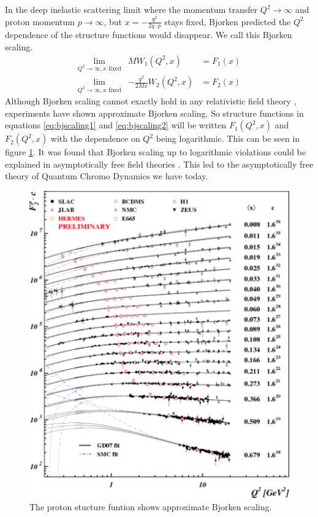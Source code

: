 \documentclass[abstract = on,listof=totoc, bibliography=totoc]{scrreprt}
\begin{document}
In the deep inelastic scattering limit where the momentum transfer $Q^2\rightarrow\infty$ and proton momentum $p\rightarrow\infty$, but $x = -\frac{q^2}{2q\cdot p}$ stays fixed, Bjorken predicted the $Q^2$ dependence of the structure functions would disappear. We call this Bjorken scaling.
\begin{eqnarray}
\lim\limits_{Q^2\rightarrow\infty, x \text{ fixed}}& MW_1(Q^2,x) &= F_1(x) \label{eq:bjscaling1}\\
\lim\limits_{Q^2\rightarrow\infty, x \text{ fixed}}& -\frac{q^2}{2Mx}W_2(Q^2,x) &= F_2(x) \label{eq:bjscaling2}
\end{eqnarray}
Although Bjorken scaling cannot exactly hold in any relativistic field theory \cite{AlderTungPhysRevLett.22.978}, experiments have shown approximate Bjorken scaling. So structure functions in equations \ref{eq:bjscaling1} and \ref{eq:bjscaling2} will be written $F_1(Q^2,x)$ and $F_2(Q^2,x)$ with the dependence on $Q^2$ being logarithmic. This can be seen in figure \ref{fig:F2Scaling}. It was found that Bjorken scaling up to logarithmic violations could be explained in asymptotically free field theories \cite{Gross:1992cw}. This led to the asymptotically free theory of Quantum Chromo Dynamics we have today. 
\begin{figure}
\begin{center}
\includegraphics[width = .6\textwidth]{StructFunc2}
\caption[Scaling of the proton structure function $F_2$]{The proton stucture funtion shows approximate Bjorken scaling.}
\label{fig:F2Scaling}
\end{center}
\end{figure}
\end{document}
